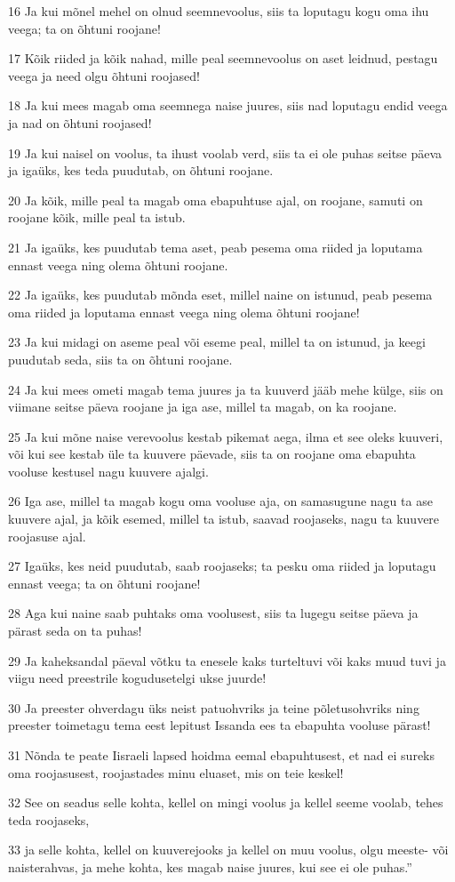 \par 16 Ja kui mõnel mehel on olnud seemnevoolus, siis ta loputagu kogu oma ihu veega; ta on õhtuni roojane!
\par 17 Kõik riided ja kõik nahad, mille peal seemnevoolus on aset leidnud, pestagu veega ja need olgu õhtuni roojased!
\par 18 Ja kui mees magab oma seemnega naise juures, siis nad loputagu endid veega ja nad on õhtuni roojased!
\par 19 Ja kui naisel on voolus, ta ihust voolab verd, siis ta ei ole puhas seitse päeva ja igaüks, kes teda puudutab, on õhtuni roojane.
\par 20 Ja kõik, mille peal ta magab oma ebapuhtuse ajal, on roojane, samuti on roojane kõik, mille peal ta istub.
\par 21 Ja igaüks, kes puudutab tema aset, peab pesema oma riided ja loputama ennast veega ning olema õhtuni roojane.
\par 22 Ja igaüks, kes puudutab mõnda eset, millel naine on istunud, peab pesema oma riided ja loputama ennast veega ning olema õhtuni roojane!
\par 23 Ja kui midagi on aseme peal või eseme peal, millel ta on istunud, ja keegi puudutab seda, siis ta on õhtuni roojane.
\par 24 Ja kui mees ometi magab tema juures ja ta kuuverd jääb mehe külge, siis on viimane seitse päeva roojane ja iga ase, millel ta magab, on ka roojane.
\par 25 Ja kui mõne naise verevoolus kestab pikemat aega, ilma et see oleks kuuveri, või kui see kestab üle ta kuuvere päevade, siis ta on roojane oma ebapuhta vooluse kestusel nagu kuuvere ajalgi.
\par 26 Iga ase, millel ta magab kogu oma vooluse aja, on samasugune nagu ta ase kuuvere ajal, ja kõik esemed, millel ta istub, saavad roojaseks, nagu ta kuuvere roojasuse ajal.
\par 27 Igaüks, kes neid puudutab, saab roojaseks; ta pesku oma riided ja loputagu ennast veega; ta on õhtuni roojane!
\par 28 Aga kui naine saab puhtaks oma voolusest, siis ta lugegu seitse päeva ja pärast seda on ta puhas!
\par 29 Ja kaheksandal päeval võtku ta enesele kaks turteltuvi või kaks muud tuvi ja viigu need preestrile kogudusetelgi ukse juurde!
\par 30 Ja preester ohverdagu üks neist patuohvriks ja teine põletusohvriks ning preester toimetagu tema eest lepitust Issanda ees ta ebapuhta vooluse pärast!
\par 31 Nõnda te peate Iisraeli lapsed hoidma eemal ebapuhtusest, et nad ei sureks oma roojasusest, roojastades minu eluaset, mis on teie keskel!
\par 32 See on seadus selle kohta, kellel on mingi voolus ja kellel seeme voolab, tehes teda roojaseks,
\par 33 ja selle kohta, kellel on kuuverejooks ja kellel on muu voolus, olgu meeste- või naisterahvas, ja mehe kohta, kes magab naise juures, kui see ei ole puhas.”

